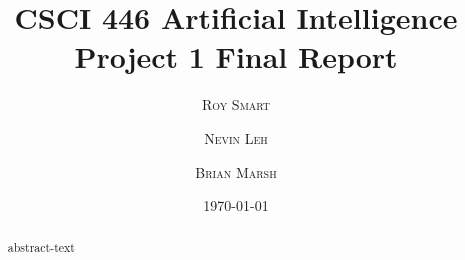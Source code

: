 \documentclass{article}
\title{\vspace{-15mm}\fontsize{24pt}{10pt}\selectfont\textbf{CSCI 446 Artificial Intelligence \\ Project 1 Final Report} \\[-2mm]} %
\date{\today}
\author{
\large
\textsc{Roy Smart} \and \textsc{Nevin Leh} \and \textsc{Brian Marsh}\\[2mm] %
}
\begin{document}
\maketitle %

\thispagestyle{fancy} %



\normalsize

\begin{abstract}
	abstract-text
\end{abstract}
\end{document}

